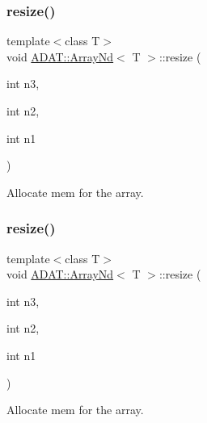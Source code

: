 \subsubsection{\texorpdfstring{resize()}{resize()}\hspace{0.1cm}{\footnotesize\ttfamily [11/15]}}
{\footnotesize\ttfamily template$<$class T$>$ \\
void \mbox{\hyperlink{classADAT_1_1ArrayNd}{A\+D\+A\+T\+::\+Array\+Nd}}$<$ T $>$\+::resize (\begin{DoxyParamCaption}\item[{int}]{n3,  }\item[{int}]{n2,  }\item[{int}]{n1 }\end{DoxyParamCaption})\hspace{0.3cm}{\ttfamily [inline]}}



Allocate mem for the array. 

\mbox{\label{classADAT_1_1ArrayNd_a1b042ead88dae6696d7a0c77fd01ddfa}} 
\subsubsection{\texorpdfstring{resize()}{resize()}\hspace{0.1cm}{\footnotesize\ttfamily [12/15]}}
{\footnotesize\ttfamily template$<$class T$>$ \\
void \mbox{\hyperlink{classADAT_1_1ArrayNd}{A\+D\+A\+T\+::\+Array\+Nd}}$<$ T $>$\+::resize (\begin{DoxyParamCaption}\item[{int}]{n3,  }\item[{int}]{n2,  }\item[{int}]{n1 }\end{DoxyParamCaption})\hspace{0.3cm}{\ttfamily [inline]}}



Allocate mem for the array. 

\mbox{\label{classADAT_1_1ArrayNd_a2a54d490a8a0a7aa9aeeaee6e6a84b90}} 
